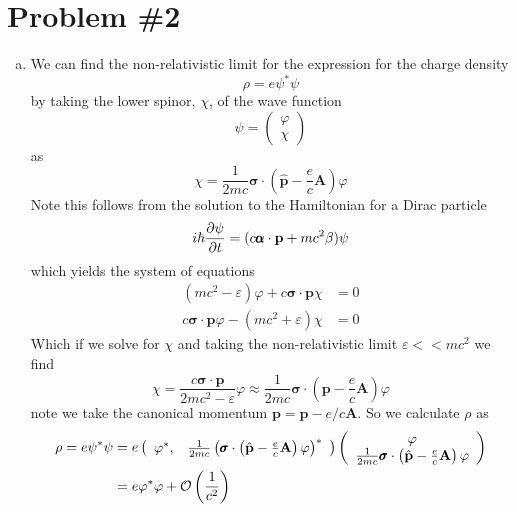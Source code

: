 \documentclass[11pt]{article}
\numberwithin{equation}{section}
\begin{document}
\section{Problem \#2}
\begin{enumerate}[(a)]
\item We can find the non-relativistic limit for the expression for the charge density 
$$\rho = e\psi^*\psi$$
by taking the lower spinor, $\chi$, of the wave function
$$\psi = \left(\begin{array}{c}
        \varphi\\
        \chi
        \end{array}\right)$$
as
$$\chi = \frac{1}{2mc}\pmb{\sigma}\cdot\left(\hat{\mathbf{p}}-\frac{e}{c}\mathbf{A}\right)\varphi$$
Note this follows from the solution to the Hamiltonian for a Dirac particle 
$$i\hbar\frac{\partial{\psi}}{\partial{t}} = (c\pmb{\alpha}\cdot\mathbf{p} + mc^2\beta)\psi$$
which yields the system of equations
\begin{align*}
(mc^2-\varepsilon)\varphi + c\pmb{\sigma}\cdot\mathbf{p}\chi &= 0\\
c\pmb{\sigma}\cdot\mathbf{p}\varphi - (mc^2+\varepsilon)\chi &= 0
\end{align*}
Which if we solve for $\chi$ and taking the non-relativistic limit $\varepsilon<<mc^2$ we 
find
$$\chi = \frac{c\pmb{\sigma}\cdot\mathbf{p}}{2mc^2-\varepsilon}\varphi\approx \frac{1}{2mc}\pmb{\sigma}\cdot\left({\mathbf{p}}-\frac{e}{c}\mathbf{A}\right)\varphi$$
note we take the canonical momentum $\mathbf{p} = \mathbf{p} - e/c\mathbf{A}$. So we
calculate $\rho$ as
\begin{align*}
\rho = e\psi^*\psi &= e\left(\begin{array}{cc}
                        \varphi^*,   &\frac{1}{2mc}\left(\pmb{\sigma}\cdot\left(\hat{\mathbf{p}}-\frac{e}{c}\mathbf{A}\right)\varphi\right)^*
                        \end{array}\right)
\left(\begin{array}{cc}
                        \varphi\\   \frac{1}{2mc}\pmb{\sigma}\cdot\left(\hat{\mathbf{p}}-\frac{e}{c}\mathbf{A}\right)\varphi
                        \end{array}\right)\\
&= e\varphi^*\varphi + \mathcal{O}\left(\frac{1}{c^2}\right)
\end{align*}


\end{enumerate}
\end{document}
